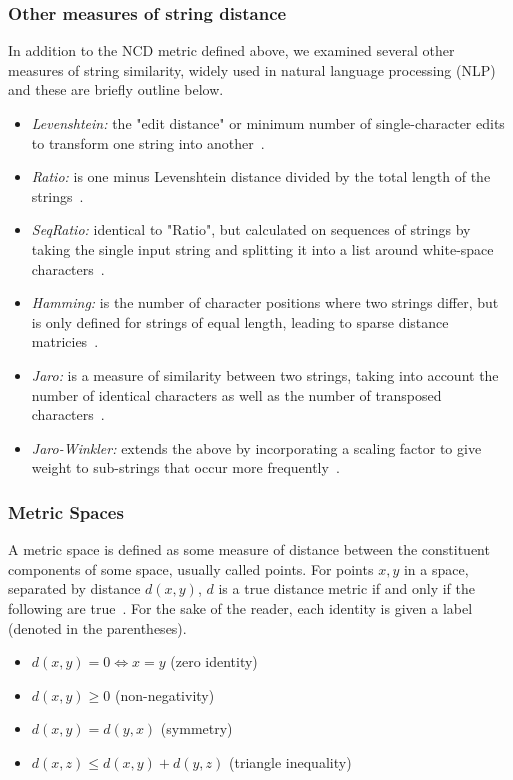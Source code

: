 \documentclass[conference]{IEEEtran}
\begin{document}
\subsubsection{Other measures of string distance}
\label{string_metrics}
In addition to the NCD metric defined above, we examined several other measures of string similarity, widely used in natural language processing (NLP) and these are briefly outline below.
\begin{itemize}
    \item \textit{Levenshtein:} the "edit distance" or minimum number of single-character edits to transform one string into another~\cite{navarro2001guided}.
    \item \textit{Ratio:} is one minus Levenshtein distance divided by the total length of the strings~\cite{levenshtein}.
    \item \textit{SeqRatio:} identical to "Ratio", but calculated on sequences of strings by taking the single input string and splitting it into a list around white-space characters~\cite{levenshtein}.
    \item \textit{Hamming:} is the number of character positions where two strings differ, but is only defined for strings of equal length, leading to sparse distance matricies~\cite{hamming_distance}.
    \item \textit{Jaro:} is a measure of similarity between two strings, taking into account the number of identical characters as well as the number of transposed characters~\cite{jaro}.
    \item \textit{Jaro-Winkler:} extends the above by incorporating a scaling factor to give weight to sub-strings that occur more frequently~\cite{jaro}. 
\end{itemize}



\subsubsection{Metric Spaces}

A metric space is defined as some measure of distance between the constituent components of some space, usually called points.  For points $x,y$ in a space, separated by distance $d(x,y)$, $d$ is a true distance metric if and only if the following are true~\cite{metrics}. For the sake of the reader, each identity is given a label (denoted in the parentheses). 

\label{metric_spaces}
\begin{itemize}
    \item $d(x, y) = 0 \iff x = y$ (zero identity)
    \item $d(x, y) \geq 0$ (non-negativity)
    \item $d(x, y) = d(y, x)$ (symmetry)
    \item $d(x, z) \leq d(x, y) + d(y, z)$ (triangle inequality)
\end{itemize}
\end{document}
